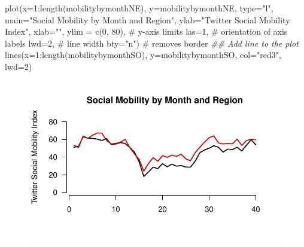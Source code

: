 \documentclass[
  letterpaper,
  DIV=11,
  numbers=noendperiod]{scrreprt}
\newenvironment{Shaded}{\begin{snugshade}}{\end{snugshade}}
\newcommand{\AttributeTok}[1]{\textcolor[rgb]{0.40,0.45,0.13}{#1}}
\newcommand{\CommentTok}[1]{\textcolor[rgb]{0.37,0.37,0.37}{#1}}
\newcommand{\DecValTok}[1]{\textcolor[rgb]{0.68,0.00,0.00}{#1}}
\newcommand{\DocumentationTok}[1]{\textcolor[rgb]{0.37,0.37,0.37}{\textit{#1}}}
\newcommand{\FunctionTok}[1]{\textcolor[rgb]{0.28,0.35,0.67}{#1}}
\newcommand{\NormalTok}[1]{\textcolor[rgb]{0.00,0.23,0.31}{#1}}
\newcommand{\SpecialCharTok}[1]{\textcolor[rgb]{0.37,0.37,0.37}{#1}}
\newcommand{\StringTok}[1]{\textcolor[rgb]{0.13,0.47,0.30}{#1}}
\begin{document}
\begin{Shaded}
\begin{Highlighting}[]
\FunctionTok{plot}\NormalTok{(}\AttributeTok{x=}\DecValTok{1}\SpecialCharTok{:}\FunctionTok{length}\NormalTok{(mobilitybymonthNE),}
     \AttributeTok{y=}\NormalTok{mobilitybymonthNE,}
     \AttributeTok{type=}\StringTok{"l"}\NormalTok{, }
     \AttributeTok{main=}\StringTok{"Social Mobility by Month and Region"}\NormalTok{,}
     \AttributeTok{ylab=}\StringTok{"Twitter Social Mobility Index"}\NormalTok{,}
     \AttributeTok{xlab=}\StringTok{""}\NormalTok{,}
     \AttributeTok{ylim =} \FunctionTok{c}\NormalTok{(}\DecValTok{0}\NormalTok{, }\DecValTok{80}\NormalTok{), }\CommentTok{\# y{-}axis limits}
     \AttributeTok{las=}\DecValTok{1}\NormalTok{, }\CommentTok{\# orientation of axis labels}
     \AttributeTok{lwd=}\DecValTok{2}\NormalTok{, }\CommentTok{\# line width}
     \AttributeTok{bty=}\StringTok{"n"}\NormalTok{) }\CommentTok{\# removes border}
\DocumentationTok{\#\# Add line to the plot }
\FunctionTok{lines}\NormalTok{(}\AttributeTok{x=}\DecValTok{1}\SpecialCharTok{:}\FunctionTok{length}\NormalTok{(mobilitybymonthSO),}
     \AttributeTok{y=}\NormalTok{mobilitybymonthSO, }\AttributeTok{col=}\StringTok{"red3"}\NormalTok{, }\AttributeTok{lwd=}\DecValTok{2}\NormalTok{)}
\end{Highlighting}
\end{Shaded}

\begin{figure}[H]

{\centering \includegraphics{05-Causalityii_files/figure-pdf/unnamed-chunk-15-1.pdf}

}

\end{figure}
\end{document}
